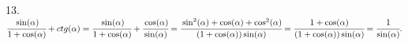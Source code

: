 13. $\cfrac{\sin(\alpha)}{1+\cos(\alpha)}+ctg(\alpha)=\cfrac{\sin(\alpha)}{1+\cos(\alpha)}+\cfrac{\cos(\alpha)}{\sin(\alpha)}=\cfrac{\sin^2(\alpha)+\cos(\alpha)+\cos^2(\alpha)}{(1+\cos(\alpha))\sin(\alpha)}
=\cfrac{1+\cos(\alpha)}{(1+\cos(\alpha))\sin(\alpha)}=\cfrac{1}{\sin(\alpha)}.$\\
